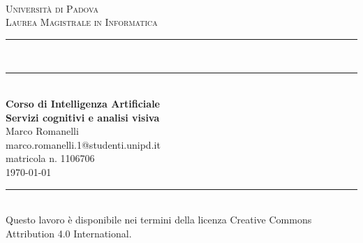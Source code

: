 \documentclass[fleqn,a4paper,11pt]{article}
\newcommand\HRule{\rule{\textwidth}{1pt}}
\newcommand\DRule{\rule{\textwidth}{.4pt}\\[\dimexpr-\baselineskip+1mm+2pt] \rule{\textwidth}{2pt}}
\begin{document}
\begin{titlepage}
\begin{center}
	\begin{minipage}{6in}
  		\centering
  		\hspace*{1.6in}
	\end{minipage}\\[1cm]
\textsc{\LARGE Universit\`a di Padova}\\[.2cm]
\textsc{\large Laurea Magistrale in Informatica}\\[.3cm]
\DRule \\[.5cm]
{\Large \bfseries Corso di Intelligenza Artificiale} \\[.4cm]
{\huge \bfseries Servizi cognitivi e analisi visiva} \\[.4cm]
{\Large Marco Romanelli} \\[.2cm]
{\footnotesize marco.romanelli.1@studenti.unipd.it} \\
{\footnotesize matricola n. 1106706} \\[1cm]
{\large \today}
\HRule \\[3cm]
\vspace*{\fill}
{\footnotesize Questo lavoro è disponibile nei termini della licenza Creative Commons Attribution 4.0 International. \cc\by}
\end{center}
\end{titlepage}



\end{document}
